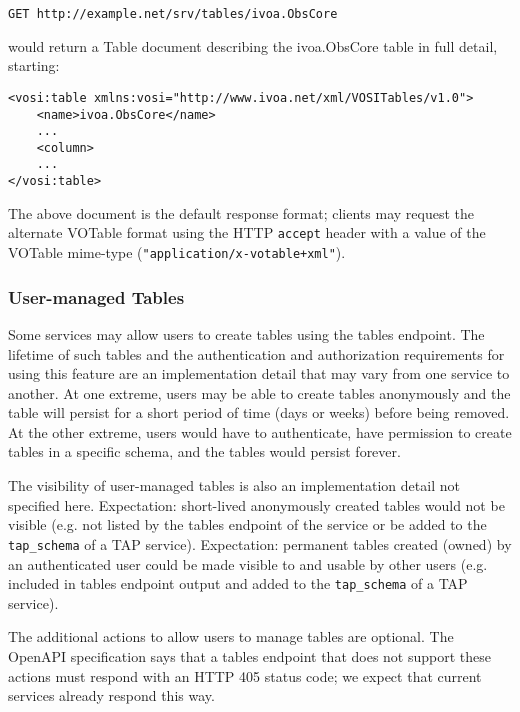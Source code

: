 \documentclass[11pt,letter]{ivoa}
\begin{document}
\begin{verbatim}
GET http://example.net/srv/tables/ivoa.ObsCore
\end{verbatim}
\noindent would return a Table document describing the ivoa.ObsCore table in full
detail, starting:

\begin{verbatim}
<vosi:table xmlns:vosi="http://www.ivoa.net/xml/VOSITables/v1.0">
    <name>ivoa.ObsCore</name>
    ...
    <column>
    ...
</vosi:table>
\end{verbatim}

The above  document is the default response format; clients 
may request the alternate VOTable format using the HTTP \verb|accept| header with a
value of the VOTable mime-type (\verb|"application/x-votable+xml"|).

\subsubsection{User-managed Tables}
Some services may allow users to create tables using the tables endpoint. The lifetime
of such tables and the authentication and authorization requirements for using this feature
are an implementation detail that may vary from one service to another. At one extreme,
users may be able to create tables anonymously and the table will persist for a short 
period of time (days or weeks) before being removed. At the other extreme, users would
have to authenticate, have permission to create tables in a specific schema, and the tables
would persist forever.

The visibility of user-managed tables is also an implementation detail not specified here.
Expectation: short-lived anonymously created tables would not be visible (e.g. not listed 
by the tables endpoint of the service or be added to the \verb|tap_schema| of a TAP service).
Expectation: permanent tables created (owned) by an authenticated user could be made
visible to and usable by other users (e.g. included in tables endpoint output and added to
the \verb|tap_schema| of a TAP service).

The additional actions to allow users to manage tables are optional. The OpenAPI specification
says that a tables endpoint that does not support these actions must respond with an HTTP
405 status code; we expect that current services already respond this way. 
\end{document}
